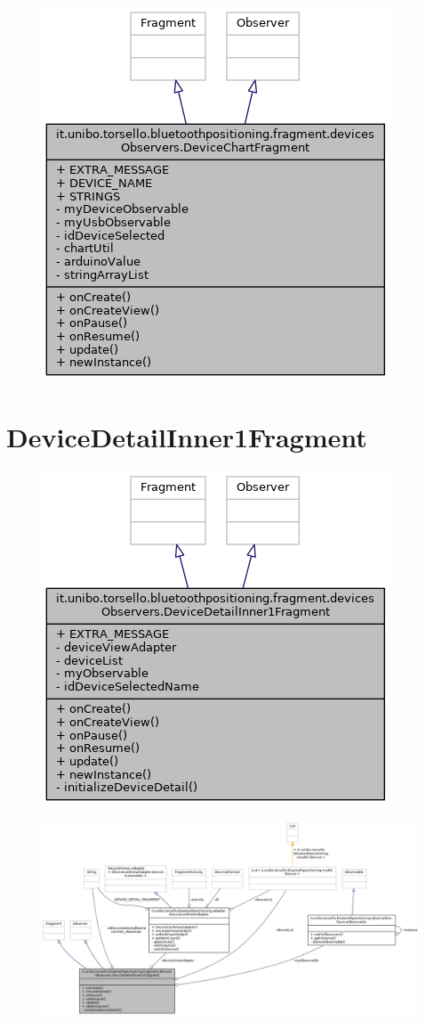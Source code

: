 \begin{figure}[ph]
	\centering
	\includegraphics[width=0.5\linewidth]{img/uml/class/classit_1_1unibo_1_1torsello_1_1bluetoothpositioning_1_1fragment_1_1devicesObservers_1_1DeviceChartFragment__inherit__graph.png}
	\caption{}
\end{figure}

\newpage
\section{DeviceDetailInner1Fragment}
\begin{figure}[ph]
	\centering
	\includegraphics[width=0.5\linewidth]{img/uml/class/classit_1_1unibo_1_1torsello_1_1bluetoothpositioning_1_1fragment_1_1devicesObservers_1_1DeviceDe8362efa0b556f228cc3338a27b7e447c.png}
	\caption{}
\end{figure}

\begin{figure}[ph]
	\centering
	\includegraphics[width=1.2\linewidth]{img/uml/class/classit_1_1unibo_1_1torsello_1_1bluetoothpositioning_1_1fragment_1_1devicesObservers_1_1DeviceDetailInner1Fragment__coll__graph.png}
	\caption{}
\end{figure}


